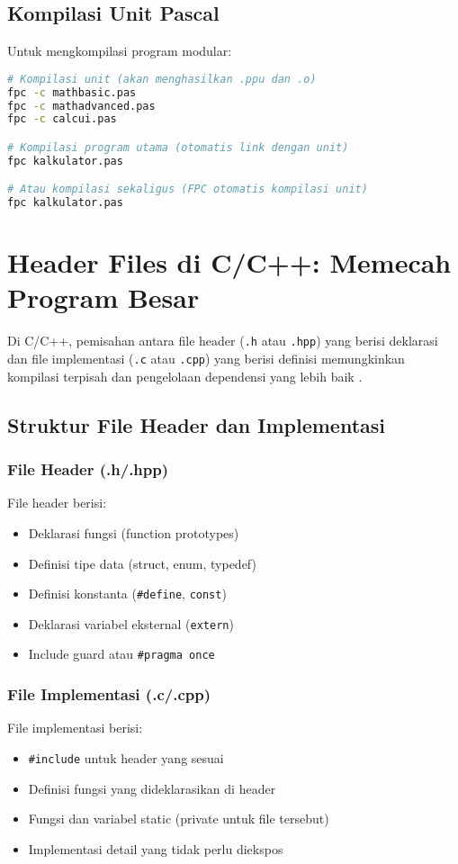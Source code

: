 \documentclass[../main.tex]{subfiles}
\begin{document}
\subsection{Kompilasi Unit Pascal}
Untuk mengkompilasi program modular:
\begin{lstlisting}[language=bash, caption={Kompilasi unit Pascal dengan Free Pascal}]
# Kompilasi unit (akan menghasilkan .ppu dan .o)
fpc -c mathbasic.pas
fpc -c mathadvanced.pas
fpc -c calcui.pas

# Kompilasi program utama (otomatis link dengan unit)
fpc kalkulator.pas

# Atau kompilasi sekaligus (FPC otomatis kompilasi unit)
fpc kalkulator.pas
\end{lstlisting}

\section{Header Files di C/C++: Memecah Program Besar}

Di C/C++, pemisahan antara file header (\texttt{.h} atau \texttt{.hpp}) yang berisi deklarasi dan file implementasi (\texttt{.c} atau \texttt{.cpp}) yang berisi definisi memungkinkan kompilasi terpisah dan pengelolaan dependensi yang lebih baik \parencite{gnu-c-manual,cpp-reference}.

\subsection{Struktur File Header dan Implementasi}

\subsubsection{File Header (.h/.hpp)}
File header berisi:
\begin{itemize}
  \item Deklarasi fungsi (function prototypes)
  \item Definisi tipe data (struct, enum, typedef)
  \item Definisi konstanta (\texttt{\#define}, \texttt{const})
  \item Deklarasi variabel eksternal (\texttt{extern})
  \item Include guard atau \texttt{\#pragma once}
\end{itemize}

\subsubsection{File Implementasi (.c/.cpp)}
File implementasi berisi:
\begin{itemize}
  \item \texttt{\#include} untuk header yang sesuai
  \item Definisi fungsi yang dideklarasikan di header
  \item Fungsi dan variabel static (private untuk file tersebut)
  \item Implementasi detail yang tidak perlu diekspos
\end{itemize}
\end{document}
